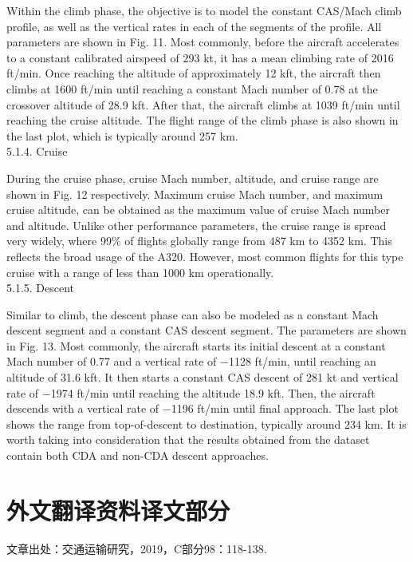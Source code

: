\documentclass[a4paper,punct,space,heading=true,AutoFakeBold]{ctexrep}
\begin{document}
Within the climb phase, the objective is to model the constant CAS/Mach climb profile, as well as the vertical rates in each of the segments of the profile. All parameters are shown in Fig. 11. Most commonly, before the aircraft accelerates to a constant calibrated airspeed of 293 kt, it has a mean climbing rate of 2016 ft/min. Once reaching the altitude of approximately 12 kft, the aircraft then climbs at 1600 ft/min until reaching a constant Mach number of 0.78 at the crossover altitude of 28.9 kft. After that, the aircraft climbs at 1039 ft/min until reaching the cruise altitude. The flight range of the climb phase is also shown in the last plot, which is typically around 257 km.\\
5.1.4. Cruise

During the cruise phase, cruise Mach number, altitude, and cruise range are shown in Fig. 12 respectively. Maximum cruise Mach number, and maximum cruise altitude, can be obtained as the maximum value of cruise Mach number and altitude.
Unlike other performance parameters, the cruise range is spread very widely, where 99\% of flights globally range from 487 km to 4352 km. This reflects the broad usage of the A320. However, most common flights for this type cruise with a range of less than 1000 km operationally.\\
5.1.5. Descent

Similar to climb, the descent phase can also be modeled as a constant Mach descent segment and a constant CAS descent segment. The parameters are shown in Fig. 13. Most commonly, the aircraft starts its initial descent at a constant Mach number of 0.77 and a vertical rate of −1128 ft/min, until reaching an altitude of 31.6 kft. It then starts a constant CAS descent of 281 kt and vertical rate of −1974 ft/min until reaching the altitude 18.9 kft. Then, the aircraft descends with a vertical rate of −1196 ft/min until final approach. The last plot shows the range from top-of-descent to destination, typically around 234 km.
It is worth taking into consideration that the results obtained from the dataset contain both CDA and non-CDA descent approaches.

\clearpage
\thispagestyle{plain}
\chapter*{外文翻译资料译文部分}

\begin{flushleft}
	\setlength\abovedisplayskip{18pt}
	文章出处：交通运输研究，2019，C部分98：118-138.
	\setlength{\baselineskip}{20pt}
	\setlength\belowdisplayskip{18pt}
\end{flushleft}
\end{document}
